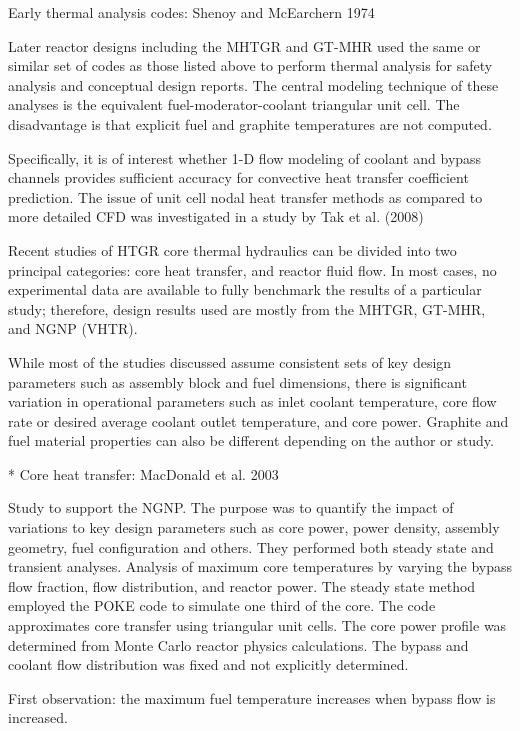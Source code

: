 Early thermal analysis codes:
Shenoy and McEarchern 1974 %

Later reactor designs including the MHTGR and GT-MHR used the same or similar set of codes as those listed above to perform thermal analysis for safety analysis and conceptual design reports.
The central modeling technique of these analyses is the equivalent fuel-moderator-coolant triangular unit cell.
The disadvantage is that explicit fuel and graphite temperatures are not computed.

Specifically, it is of interest whether 1-D flow modeling of coolant and bypass channels provides sufficient accuracy for convective heat transfer coefficient prediction.
The issue of unit cell nodal heat transfer methods as compared to more detailed CFD was investigated in a study by Tak et al. (2008) %

Recent studies of HTGR core thermal hydraulics can be divided into two principal categories: core heat transfer, and reactor fluid flow.
In most cases, no experimental data are available to fully benchmark the results of a particular study; therefore, design results used are mostly from the MHTGR, GT-MHR, and NGNP (VHTR).

While most of the studies discussed assume consistent sets of key design parameters such as assembly block and fuel dimensions, there is significant variation in operational parameters such as inlet coolant temperature, core flow rate or desired average coolant outlet temperature, and core power.
Graphite and fuel material properties can also be different depending on the author or study.

* Core heat transfer:
MacDonald et al. 2003 %

Study to support the NGNP.
The purpose was to quantify the impact of variations to key design parameters such as core power, power density, assembly geometry, fuel configuration and others.
They performed both steady state and transient analyses.
Analysis of maximum core temperatures by varying the bypass flow fraction, flow distribution, and reactor power.
The steady state method employed the POKE code to simulate one third of the core.
The code approximates core transfer using triangular unit cells.
The core power profile was determined from Monte Carlo reactor physics calculations.
The bypass and coolant flow distribution was fixed and not explicitly determined.

First observation: the maximum fuel temperature increases when bypass flow is increased.


